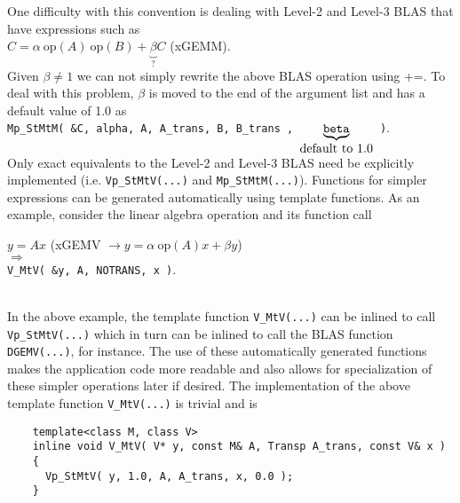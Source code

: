 \documentclass[acmtoms,acmnow]{acmtrans2m}
\begin{document}
One difficulty with this convention is dealing with Level-2 and Level-3 BLAS
that have expressions such as\\[1ex]

\hspace*{4ex}$C = \alpha \: \mbox{op}(A) \: \mbox{op}(B) + \underbrace{\beta}_{
	\mbox{?} } C$ \hspace{4ex} (xGEMM).\\[1ex]

Given $\beta \neq 1$ we can not simply rewrite the above BLAS operation using
+=.  To deal with this problem, $\beta$ is moved to the end of the argument
list and has a default value of 1.0 as\\[1.0ex]

\hspace*{4ex}\texttt{Mp\_StMtM( \&C, alpha, A, A\_trans, B, B\_trans
	, $\underbrace{\mbox{\texttt{beta}}}_{\mbox{default to 1.0}}$ )}.\\[1.0ex]

Only exact equivalents to the Level-2 and Level-3 BLAS need be explicitly
implemented (i.e. {}\texttt{Vp\_StMtV(...)} and {}\texttt{Mp\_StMtM(...)}).
Functions for simpler expressions can be generated automatically using
template functions.  As an example, consider the linear algebra operation and
its function call\\[1.0ex]

{\bsinglespace
\hspace*{4ex}\parbox{\textwidth}{
$y = A x$ \hspace{4ex} (xGEMV $\rightarrow y = \alpha \: \mbox{op}(A) x + \beta y$)\\
$\Longrightarrow$\\
\texttt{V\_MtV( \&y, A, NOTRANS, x )}.
}
\esinglespace}\\[1.0ex]

In the above example, the template function {}\texttt{V\_MtV(...)} can be
inlined to call {}\texttt{Vp\_StMtV(...)} which in turn can be inlined to call
the BLAS function {}\texttt{DGEMV(...)}, for instance.  The use of these
automatically generated functions makes the application code more readable and
also allows for specialization of these simpler operations later if desired.
The implementation of the above template function {}\texttt{V\_MtV(...)} is
trivial and is

{\bsinglespace\small
\begin{verbatim}
    template<class M, class V>
    inline void V_MtV( V* y, const M& A, Transp A_trans, const V& x )
    {
      Vp_StMtV( y, 1.0, A, A_trans, x, 0.0 );
    }
\end{verbatim}
\esinglespace}
\end{document}
